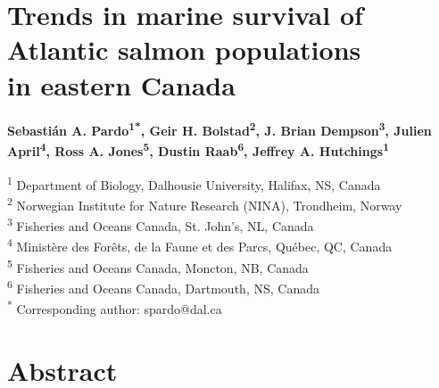 \documentclass[12pt]{article}
\begin{document}
\linenumbers


\section*{Trends in marine survival of Atlantic salmon populations \\ in eastern Canada}

\textbf{Sebasti\'{a}n A. Pardo\textsuperscript{1*}, 
        Geir H. Bolstad\textsuperscript{2}, 
        J. Brian Dempson\textsuperscript{3}, 
        Julien April\textsuperscript{4}, 
        Ross A. Jones\textsuperscript{5}, 
        Dustin Raab\textsuperscript{6}, 
Jeffrey A. Hutchings\textsuperscript{1}} 

\noindent\small{\textsuperscript{1} Department of Biology, Dalhousie University, Halifax, NS, Canada\\}
\small{\textsuperscript{2} Norwegian Institute for Nature Research (NINA), Trondheim, Norway\\}
\small{\textsuperscript{3} Fisheries and Oceans Canada, St. John's, NL, Canada\\}
\small{\textsuperscript{4} Minist\`{e}re des For\^{e}ts, de la Faune et des Parcs, Qu\'{e}bec, QC, Canada\\}
\small{\textsuperscript{5} Fisheries and Oceans Canada, Moncton, NB, Canada\\}
\small{\textsuperscript{6} Fisheries and Oceans Canada, Dartmouth, NS, Canada\\}
\small{\textsuperscript{*} Corresponding author: spardo@dal.ca}

\section*{Abstract}
\end{document}
